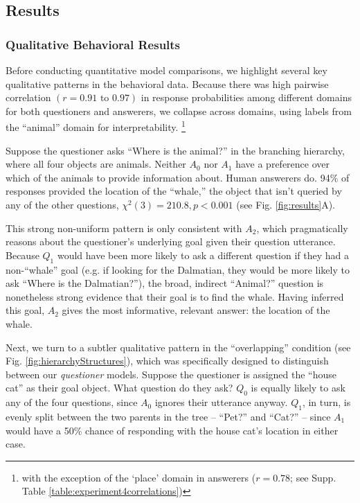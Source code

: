 \documentclass[12pt, floatsintext, jou]{apa6}
\begin{document}
\subsection{Results}
\subsubsection{Qualitative Behavioral Results}

Before conducting quantitative model comparisons, we highlight several key qualitative patterns in the behavioral data. 
Because there was high pairwise correlation $(r = 0.91 \textrm{ to } 0.97)$ in response probabilities among different domains for both questioners and answerers, we collapse across domains, using labels from the ``animal'' domain for interpretability. \footnote{with the exception of the `place' domain in answerers ($r = 0.78$; see Supp. Table \ref{table:experiment4correlations})}

Suppose the questioner asks ``Where is the animal?'' in the branching hierarchy, where all four objects are animals. Neither $A_0$ nor $A_1$ have a preference over which of the animals to provide information about. Human answerers do. 94\% of responses provided the location of the ``whale,'' the object that isn't queried by any of the other questions, $\chi^2(3) = 210.8, p < 0.001$ (see Fig. \ref{fig:results}A).

This strong non-uniform pattern %
is only consistent with $A_2$, which pragmatically reasons about the questioner's underlying goal given their question utterance. Because $Q_1$ would have been more likely to ask a different question if they had a non-``whale'' goal (e.g. if looking for the Dalmatian, they would be more likely to ask ``Where is the Dalmatian?''), the broad, indirect ``Animal?'' question is nonetheless strong evidence that their goal is to find the whale. Having inferred this goal, $A_2$ gives the most informative, relevant answer: the location of the whale.

Next, we turn to a subtler qualitative pattern in the ``overlapping'' condition (see Fig. \ref{fig:hierarchyStructures}), which was specifically designed to distinguish between our \emph{questioner} models. Suppose the questioner is assigned the ``house cat'' as their goal object. What question do they ask? $Q_0$ is equally likely to ask any of the four questions, since $A_0$ ignores their utterance anyway. $Q_1$, in turn, is evenly split between the two parents in the tree -- ``Pet?'' and ``Cat?'' -- since $A_1$ would have a 50\% chance of responding with the house cat's location in either case. 
\end{document}
